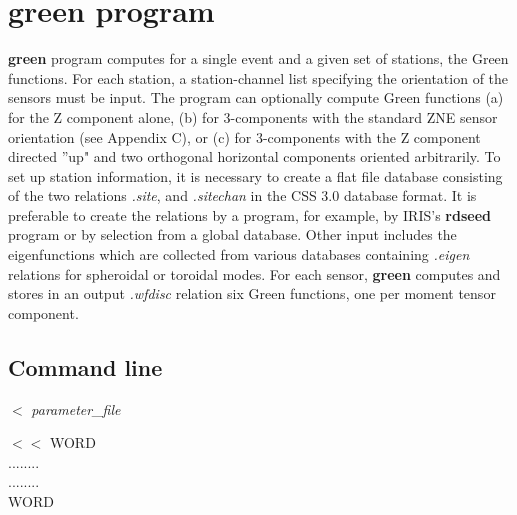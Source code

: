 \section{green program}

{\bf green} program computes for a single event and a given
set of stations, the Green functions. For each station,
a station-channel list specifying the orientation of the sensors must
be input.
The program can optionally compute Green functions (a) for
the Z component alone, (b) for 3-components  with the standard ZNE sensor
orientation (see Appendix C), or (c) for 3-components with the Z component 
directed ''up" and two orthogonal horizontal components oriented 
arbitrarily. To set up station information, it is necessary to create 
a flat file database consisting of the two relations
{\it .site}, and {\it .sitechan} in the CSS 3.0 database format.
It is preferable to create the relations by a program, for example, by
IRIS's {\bf rdseed} program or by selection from a global database.
Other input includes the eigenfunctions which are collected from various databases
containing {\it .eigen} relations for spheroidal or toroidal modes. 
For each sensor, {\bf green} computes and stores in an output {\it .wfdisc} relation
six Green functions, one per moment tensor component. 

\subsection {Command line}


 $<$ {\it parameter\_file}

 $<<$ WORD \\
\noindent ........  \\
\noindent ........  \\
\noindent WORD

